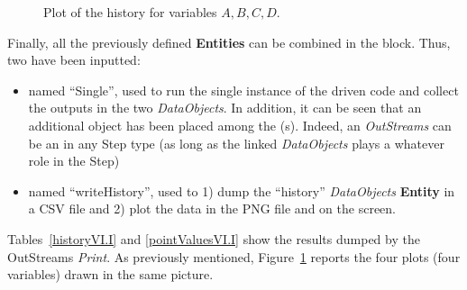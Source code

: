 \begin{enumerate}
\begin{figure}[h!]
  \caption{Plot of the history for variables $A,B,C,D$.}
  \label{fig:historyPlotLine}
 \end{figure}
   Finally, all the previously defined \textbf{Entities} can be combined in the  block. Thus, 
   two  have been inputted:
   \begin{itemize}
     \item {} named ``Single'', used to run the single instance of the driven code and collect 
     the outputs in the two \textit{DataObjects}. In addition, it can be seen that an additional object has been  
     placed among the (s). Indeed, an  \textit{OutStreams} can be an  in 
     any Step type (as long as the linked \textit{DataObjects} plays a whatever role in the Step)
     \item  {} named ``writeHistory'', used to 1) dump the ``history'' \textit{DataObjects} 
     \textbf{Entity} in a CSV file and 2) plot the data in the PNG file and on the screen.
   \end{itemize}
\end{enumerate} 
 Tables~\ref{historyVI.I} and \ref{pointValuesVI.I} show the results dumped by the OutStreams \textit{Print}.
 As previously mentioned, Figure~\ref{fig:historyPlotLine} reports the four plots (four variables) drawn in the same picture. 
